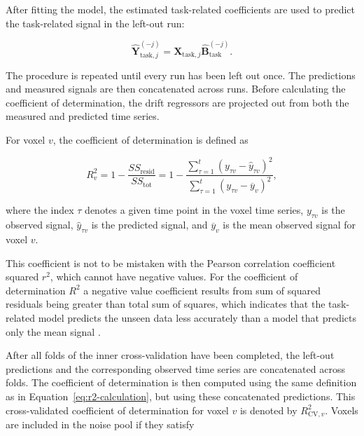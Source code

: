 \documentclass[english]{pwr_wmat_praca_dyplomowa}
\theoremstyle{definition}
\theoremstyle{remark}
\begin{document}
After fitting the model, the estimated task-related coefficients are used to predict the task-related signal in the left-out run:

\begin{equation}
    \widehat{\mathbf{Y}}_{\mathrm{task},j}^{(-j)} = \mathbf{X}_{\mathrm{task},j} \widehat{\mathbf{B}}_{\mathrm{task}}^{(-j)}.
    \label{eq:pca-cv-task-prediction}
\end{equation}

The procedure is repeated until every run has been left out once. The predictions and measured signals are then concatenated across runs. Before calculating the coefficient of determination, the drift regressors are projected out from both the measured and predicted time series.

For voxel $v$, the coefficient of determination is defined as \cite[Equation 3.]{coefficient-determination}

\begin{equation}
    R^2_{v} = 1 - \frac{SS_{\text{resid}}}{SS_{\text{tot}}} 
    = 1 - \frac{\sum_{\tau = 1}^t \left(y_{\tau v} - \widehat{y}_{\tau v}\right)^2}{\sum_{\tau = 1}^t \left(y_{\tau v} - \overline{y}_v \right)^2},
    \label{eq:r2-calculation}
\end{equation}

where the index $\tau$ denotes a given time point in the voxel time series, $y_{\tau v}$ is the observed signal, $\widehat{y}_{\tau v}$ is the predicted signal, and $\overline{y}_v$ is the mean observed signal for voxel $v$.

This coefficient is not to be mistaken with the Pearson correlation coefficient squared $r^2$, which cannot have negative values. For the coefficient of determination $R^2$ a negative value coefficient results from sum of squared residuals being greater than total sum of squares, which indicates that the task-related model predicts the unseen data less accurately than a model that predicts only the mean signal \cite{coefficient-determination}.

After all folds of the inner cross-validation have been completed, the left-out predictions and the corresponding observed time series are concatenated across folds. The coefficient of determination is then computed using the same definition as in Equation~\eqref{eq:r2-calculation}, but using these concatenated predictions. This cross-validated coefficient of determination for voxel $v$ is denoted by $R^2_{\mathrm{CV},v}$. Voxels are included in the noise pool if they satisfy
\end{document}
